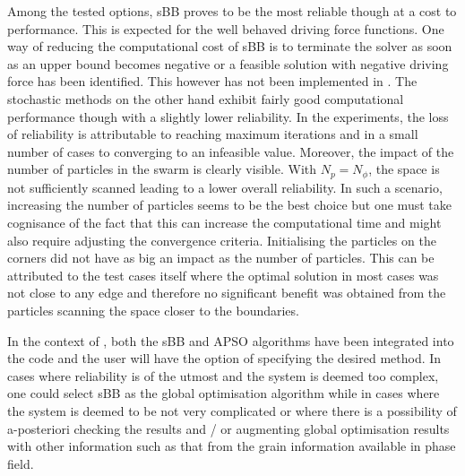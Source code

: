 Among the tested options, sBB proves to be the most reliable though at a cost to performance. This is expected for the well behaved driving force functions. One way of reducing the computational cost of sBB is to terminate the solver as soon as an upper bound becomes negative or a feasible solution with negative driving force has been identified. This however has not been implemented in {\GEM}. The stochastic methods on the other hand exhibit fairly good computational performance though with a slightly lower reliability. In the experiments, the loss of reliability is attributable to reaching maximum iterations and in a small number of cases to converging to an infeasible value. Moreover, the impact of the number of particles in the swarm is clearly visible. With $N_p = N_\phi$, the space is not sufficiently scanned leading to a lower overall reliability. In such a scenario, increasing the number of particles seems to be the best choice but one must take cognisance of the fact that this can increase the computational time and might also require adjusting the convergence criteria. Initialising the particles on the corners did not have as big an impact as the number of particles. This can be attributed to the test cases itself where the optimal solution in most cases was not close to any edge and therefore no significant benefit was obtained from the particles scanning the space closer to the boundaries.

In the context of {\YJ}, both the sBB and APSO algorithms have been integrated into the code and the user will have the option of specifying the desired method. In cases where reliability is of the utmost and the system is deemed too complex, one could select sBB as the global optimisation algorithm while in cases where the system is deemed to be not very complicated or where there is a possibility of a-posteriori checking the results and / or augmenting global optimisation results with other information such as that from the grain information available in phase field.
	

